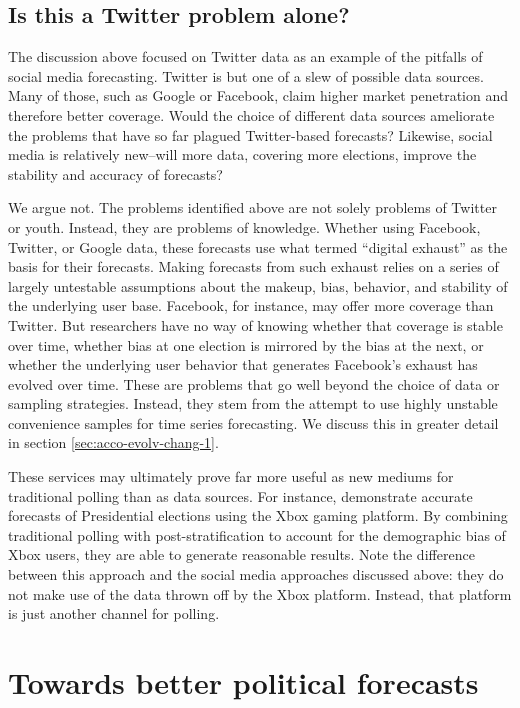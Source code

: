 \documentclass{article}
\begin{document}
\subsection{Is this a Twitter problem alone?}
\label{sec:this-twitter-problem}

The discussion above focused on Twitter data as an example of the
pitfalls of social media forecasting. Twitter is but one of a slew of
possible data sources. Many of those, such as Google or Facebook,
claim higher market penetration and therefore better coverage. Would
the choice of different data sources ameliorate the problems that have
so far plagued Twitter-based forecasts? Likewise, social media is
relatively new--will more data, covering more elections, improve the
stability and accuracy of forecasts?

We argue not. The problems identified above are not solely problems of
Twitter or youth. Instead, they are problems of knowledge. Whether
using Facebook, Twitter, or Google data, these forecasts use what
\cite{mckinsey2011} termed ``digital exhaust'' as the basis for their
forecasts. Making forecasts from such exhaust relies on a series of
largely untestable assumptions about the makeup, bias, behavior, and
stability of the underlying user base. Facebook, for instance, may
offer more coverage than Twitter. But researchers have no way of
knowing whether that coverage is stable over time, whether bias at one
election is mirrored by the bias at the next, or whether the
underlying user behavior that generates Facebook's exhaust has evolved
over time. These are problems that go well beyond the choice of data
or sampling strategies. Instead, they stem from the attempt to use
highly unstable convenience samples for time series forecasting. We
discuss this in greater detail in section
\ref{sec:acco-evolv-chang-1}.

These services may ultimately prove far more useful as new
mediums for traditional polling than as data sources. For
instance, \cite{wanga2013forecasting} demonstrate accurate forecasts
of Presidential elections using the Xbox gaming platform. By combining
traditional polling with post-stratification to account for the
demographic bias of Xbox users, they are able to generate reasonable
results. Note the difference between this approach and the social
media approaches discussed above: they do not make use of the data
thrown off by the Xbox platform. Instead, that platform is just
another channel for polling. 

\section{Towards better political forecasts}
\label{sec:towards-bett-polit}
\end{document}
